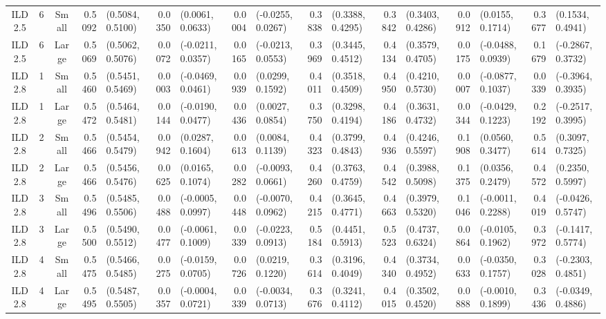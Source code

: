 \begin{landscape}
\begin{table}
\begin{tabular}{cccrlrlrlrlrlrlrl}
ILD2.5	&	6	&	Small	&	0.5092	&	(0.5084, 0.5100)	&	0.0350	&	(0.0061, 0.0633)	&	0.0004	&	(-0.0255, 0.0267)	&	0.3838	&	(0.3388, 0.4295)	&	0.3842	&	(0.3403, 0.4286)	&	0.0912	&	(0.0155, 0.1714)	&	0.3677	&	(0.1534, 0.4941)	\\
ILD2.5	&	6	&	Large	&	0.5069	&	(0.5062, 0.5076)	&	0.0072	&	(-0.0211, 0.0357)	&	0.0165	&	(-0.0213, 0.0553)	&	0.3969	&	(0.3445, 0.4512)	&	0.4134	&	(0.3579, 0.4705)	&	0.0175	&	(-0.0488, 0.0939)	&	0.1679	&	(-0.2867, 0.3732)	\\
ILD2.8	&	1	&	Small	&	0.5460	&	(0.5451, 0.5469)	&	0.0003	&	(-0.0469, 0.0461)	&	0.0939	&	(0.0299, 0.1592)	&	0.4011	&	(0.3518, 0.4509)	&	0.4950	&	(0.4210, 0.5730)	&	0.0007	&	(-0.0877, 0.1037)	&	0.0339	&	(-0.3964, 0.3935)	\\
ILD2.8	&	1	&	Large	&	0.5472	&	(0.5464, 0.5481)	&	0.0144	&	(-0.0190, 0.0477)	&	0.0436	&	(0.0027, 0.0854)	&	0.3750	&	(0.3298, 0.4194)	&	0.4186	&	(0.3631, 0.4732)	&	0.0344	&	(-0.0429, 0.1223)	&	0.2192	&	(-0.2517, 0.3995)	\\
ILD2.8	&	2	&	Small	&	0.5466	&	(0.5454, 0.5479)	&	0.0942	&	(0.0287, 0.1604)	&	0.0613	&	(0.0084, 0.1139)	&	0.4323	&	(0.3799, 0.4843)	&	0.4936	&	(0.4246, 0.5597)	&	0.1908	&	(0.0560, 0.3477)	&	0.5614	&	(0.3097, 0.7325)	\\
ILD2.8	&	2	&	Large	&	0.5466	&	(0.5456, 0.5476)	&	0.0625	&	(0.0165, 0.1074)	&	0.0282	&	(-0.0093, 0.0661)	&	0.4260	&	(0.3763, 0.4759)	&	0.4542	&	(0.3988, 0.5098)	&	0.1375	&	(0.0356, 0.2479)	&	0.4572	&	(0.2350, 0.5997)	\\
ILD2.8	&	3	&	Small	&	0.5496	&	(0.5485, 0.5506)	&	0.0488	&	(-0.0005, 0.0997)	&	0.0448	&	(-0.0070, 0.0962)	&	0.4215	&	(0.3645, 0.4771)	&	0.4663	&	(0.3979, 0.5320)	&	0.1046	&	(-0.0011, 0.2288)	&	0.4019	&	(-0.0426, 0.5747)	\\
ILD2.8	&	3	&	Large	&	0.5500	&	(0.5490, 0.5512)	&	0.0477	&	(-0.0061, 0.1009)	&	0.0339	&	(-0.0223, 0.0913)	&	0.5184	&	(0.4451, 0.5913)	&	0.5523	&	(0.4737, 0.6324)	&	0.0864	&	(-0.0105, 0.1962)	&	0.3972	&	(-0.1417, 0.5774)	\\
ILD2.8	&	4	&	Small	&	0.5475	&	(0.5466, 0.5485)	&	0.0275	&	(-0.0159, 0.0705)	&	0.0726	&	(0.0219, 0.1220)	&	0.3614	&	(0.3196, 0.4049)	&	0.4340	&	(0.3734, 0.4952)	&	0.0633	&	(-0.0350, 0.1757)	&	0.3028	&	(-0.2303, 0.4851)	\\
ILD2.8	&	4	&	Large	&	0.5495	&	(0.5487, 0.5505)	&	0.0357	&	(-0.0004, 0.0721)	&	0.0339	&	(-0.0034, 0.0713)	&	0.3676	&	(0.3241, 0.4112)	&	0.4015	&	(0.3502, 0.4520)	&	0.0888	&	(-0.0010, 0.1899)	&	0.3436	&	(-0.0349, 0.4886)	\\

\end{tabular}
\end{table}
\end{landscape}
